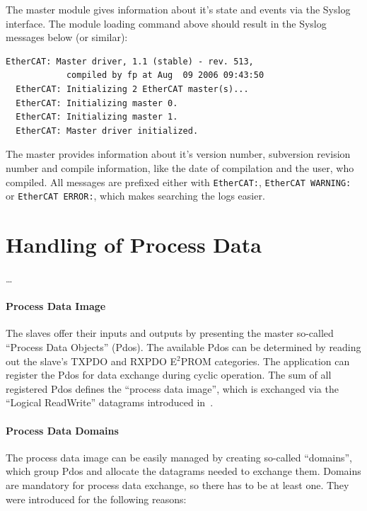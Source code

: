 \documentclass[a4paper,12pt,BCOR6mm,bibtotoc,idxtotoc]{scrbook}
\begin{document}
The master module gives information about it's state and events via
the Syslog interface. The module loading command above should result
in the Syslog messages below (or similar):

\begin{lstlisting}[gobble=2]
  EtherCAT: Master driver, 1.1 (stable) - rev. 513,
            compiled by fp at Aug  09 2006 09:43:50
  EtherCAT: Initializing 2 EtherCAT master(s)...
  EtherCAT: Initializing master 0.
  EtherCAT: Initializing master 1.
  EtherCAT: Master driver initialized.
\end{lstlisting}

The master provides information about it's version number, subversion
revision number and compile information, like the date of compilation
and the user, who compiled. All messages are prefixed either with
\texttt{EtherCAT:}, \texttt{EtherCAT WARNING:} or \texttt{EtherCAT
  ERROR:}, which makes searching the logs easier.


\section{Handling of Process Data} %
\label{sec:processdata}

\ldots

\paragraph{Process Data Image}

The slaves offer their inputs and outputs by presenting the master so-called
``Process Data Objects'' (Pdos). The available Pdos can be
determined by reading out the slave's TXPDO and RXPDO E$^2$PROM categories. The
application can register the Pdos for data exchange during cyclic operation.
The sum of all registered Pdos defines the ``process data image'', which is
exchanged via the ``Logical ReadWrite'' datagrams introduced
in~\cite[section~5.4.2.4]{dlspec}.

\paragraph{Process Data Domains}

The process data image can be easily managed by creating so-called
``domains'', which group Pdos and allocate the datagrams needed to
exchange them. Domains are mandatory for process data exchange, so
there has to be at least one. They were introduced for the following
reasons:
\end{document}
